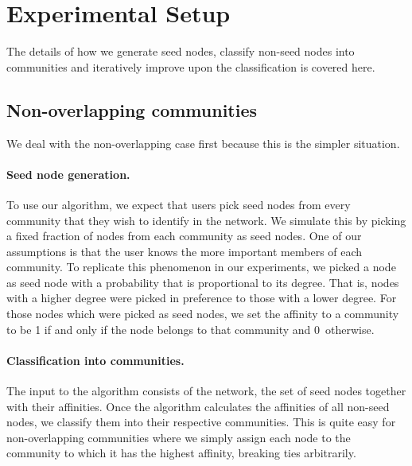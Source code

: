 %

\section{Experimental Setup}

The details of how we generate seed nodes, classify non-seed nodes into communities and iteratively 
improve upon the classification is covered here.

\subsection{Non-overlapping communities}
We deal with the non-overlapping case first because this is the simpler situation. 

\paragraph{Seed node generation.} 
To use our algorithm, we expect that users pick seed nodes from 
every community that they wish to identify in the network. 
We simulate this by picking a fixed fraction of nodes from each community as seed nodes.
One of our assumptions is that the user knows the more important members of each community. 
To replicate this phenomenon in our experiments, we picked a node as seed node
with a probability that is proportional to its degree.
That is, nodes with a higher degree were picked in preference to those with a lower degree.
For those nodes which were picked as seed nodes, we set the affinity to a community to be 1 if 
and only if the node belongs to that community and 0~otherwise.

\paragraph{Classification into communities.}
The input to the algorithm consists of the network, the set of seed nodes together with their 
affinities. Once the algorithm calculates the affinities of all non-seed nodes, we classify 
them into their respective communities. This is quite easy for non-overlapping 
communities where we simply assign each node to the community to which it has the 
highest affinity, breaking ties arbitrarily.

